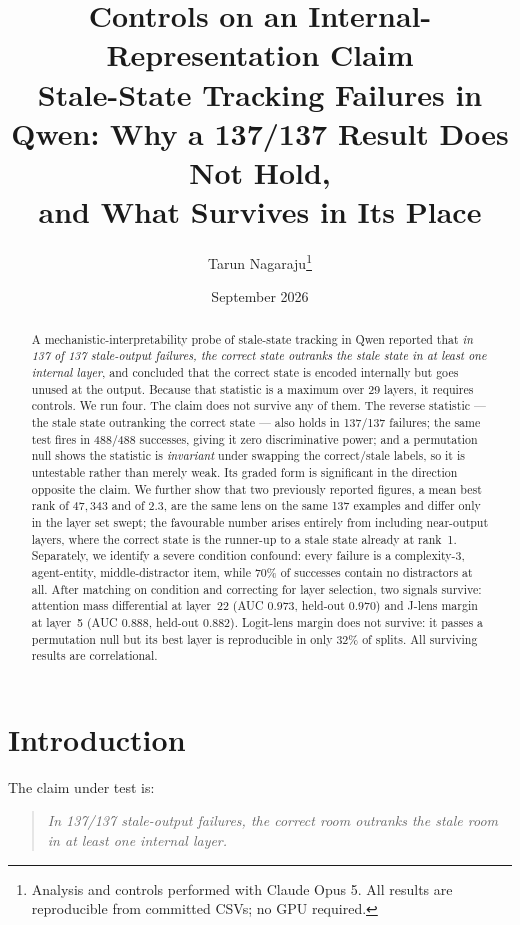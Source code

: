\documentclass[11pt]{article}
\title{\bfseries Controls on an Internal-Representation Claim\\[2pt]
\large Stale-State Tracking Failures in Qwen: Why a 137/137 Result Does Not Hold,\\and What Survives in Its Place}
\author{Tarun Nagaraju\thanks{Analysis and controls performed with Claude Opus 5. All results are
reproducible from committed CSVs; no GPU required.}}
\date{September 2026}
\begin{document}
\maketitle

\begin{abstract}
\noindent
A mechanistic-interpretability probe of stale-state tracking in Qwen reported that
\emph{in 137 of 137 stale-output failures, the correct state outranks the stale state in at
least one internal layer}, and concluded that the correct state is encoded internally but
goes unused at the output. Because that statistic is a maximum over 29 layers, it requires
controls. We run four. The claim does not survive any of them. The reverse statistic ---
the stale state outranking the correct state --- also holds in 137/137 failures; the same
test fires in 488/488 successes, giving it zero discriminative power; and a permutation
null shows the statistic is \emph{invariant} under swapping the correct/stale labels, so it
is untestable rather than merely weak. Its graded form is significant in the direction
opposite the claim. We further show that two previously reported figures, a mean best rank
of $47{,}343$ and of $2.3$, are the same lens on the same 137 examples and differ only in
the layer set swept; the favourable number arises entirely from including near-output
layers, where the correct state is the runner-up to a stale state already at rank~1.
Separately, we identify a severe condition confound: every failure is a
complexity-3, agent-entity, middle-distractor item, while $70\%$ of successes contain no
distractors at all. After matching on condition and correcting for layer selection, two
signals survive: attention mass differential at layer~22 (AUC $0.973$, held-out $0.970$)
and J-lens margin at layer~5 (AUC $0.888$, held-out $0.882$). Logit-lens margin does not
survive: it passes a permutation null but its best layer is reproducible in only $32\%$ of
splits. All surviving results are correlational.
\end{abstract}

\section{Introduction}

The claim under test is:

\begin{quote}
\itshape In 137/137 stale-output failures, the correct room outranks the stale room in at
least one internal layer.
\end{quote}
\end{document}
